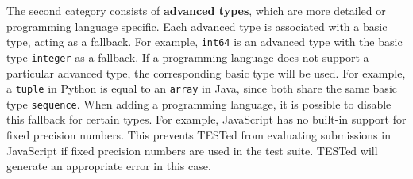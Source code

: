 \documentclass[../main]{subfiles}
\begin{document}
\begin{table}
    \caption{
        Overview of the basic types of TESTed and their implementation in the programming languages supported by TESTed.
        Sometimes, another type is used instead, based on the value. For example, an integer that is too large for \texttt{int} in Java will become a \texttt{long}.
        A dash (-) is used to indicate that the programming language does not support this type.
    }
    \label{tab:tested-basic-types}
\end{table}

The second category consists of \textbf{advanced types}, which are more detailed or programming language specific.
Each advanced type is associated with a basic type, acting as a fallback.
For example, \texttt{int64} is an advanced type with the basic type \texttt{integer} as a fallback.
If a programming language does not support a particular advanced type, the corresponding basic type will be used.
For example, a \texttt{tuple} in Python is equal to an \texttt{array} in Java, since both share the same basic type \texttt{sequence}.
When adding a programming language, it is possible to disable this fallback for certain types.
For example, JavaScript has no built-in support for fixed precision numbers.
This prevents TESTed from evaluating submissions in JavaScript if fixed precision numbers are used in the test suite.
TESTed will generate an appropriate error in this case.
\end{document}
